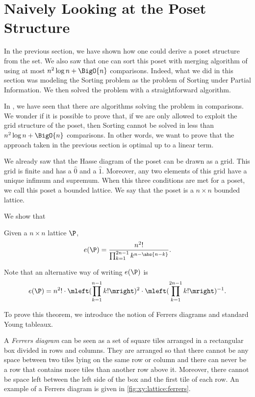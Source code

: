 \section{Naively Looking at the Poset Structure}
\label{tree:xy:grid}

In the previous section, we have shown how one could derive a poset structure
from the \XY set. We also saw that one can sort this \XY poset with
merging algorithm of 
using at most \(n^2 \log n + \BigO{n}\) comparisons. Indeed, what we
did in this section was modeling the Sorting \XY problem as the problem of
Sorting under Partial Information. We then solved the problem with a
straightforward algorithm.

In , we have seen that there are algorithms solving the \SUPI
problem in  comparisons. We wonder if it is possible to prove
that, if we are only allowed to exploit the grid structure of the \XY poset,
then Sorting \XY cannot be solved in less than \(n^2 \log n + \BigO{n}\)
comparisons. In other words, we want to prove that the approach taken in the
previous section is optimal up to a linear term.

We already saw that the Hasse diagram of the poset \XY can be drawn as a grid.
This grid is finite and has a \(\hat{0}\) and a \(\hat{1}\). Moreover, any
two elements of this grid have a unique infimum and supremum. When this three
conditions are met for a poset, we call this poset a bounded lattice. We say
that the poset \XY is a \( n \times n \) bounded lattice.

We show that
\begin{theorem}
Given a \( n \times n \) lattice \(\P\),
\begin{displaymath}
e(\P) = \frac{n^2!}{\prod_{k=1}^{2n-1} k^{n - \abs{n-k}}}.
\end{displaymath}
\end{theorem}
Note that an alternative way of writing \(e(\P)\) is
\begin{displaymath}
e(\P) = n^2! \cdot \mleft(\prod_{k=1}^{n-1} k!\mright)^2 \cdot
\mleft(\prod_{k=1}^{2n-1} k!\mright)^{-1}.
\end{displaymath}

To prove this theorem, we introduce the notion of Ferrers diagrams and standard Young tableaux.

A \emph{Ferrers diagram} can be seen as a set of square tiles arranged in a
rectangular
box divided in rows and columns. They are arranged so that there cannot be any space between two tiles
lying on the same row or column and there can never be a row that contains more
tiles than another row above it. Moreover, there cannot be space left between
the left side of the box and the first tile of each row. An example of a
Ferrers diagram is given in \ref{fig:xy:lattice:ferrers}.

